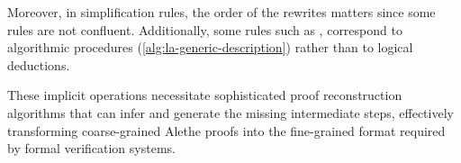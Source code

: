 Moreover, in simplification rules, the order of the rewrites matters since some rules are not confluent.
Additionally, some rules such as , correspond to algorithmic procedures (\cref{alg:la-generic-description}) rather than to logical deductions.

These implicit operations necessitate sophisticated proof reconstruction algorithms that can infer
and generate the missing intermediate steps, effectively transforming coarse-grained Alethe proofs
into the fine-grained format required by formal verification systems.
